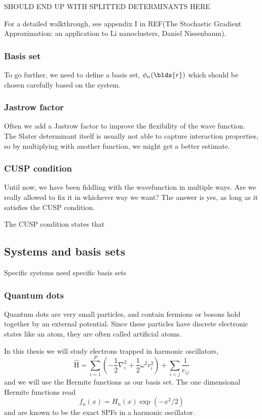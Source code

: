 SHOULD END UP WITH SPLITTED DETERMINANTS HERE

For a detailed walkthrough, see appendix I in REF(The Stochastic Gradient Approximation: an application to Li nanoclusters, Daniel Nissenbaum). 

\subsubsection{Basis set} \label{subsubsec:basisset}
To go further, we need to define a basis set, $\phi_n(\blds{r})$ which should be chosen carefully based on the system. 

\subsubsection{Jastrow factor} \label{subsubsec:jastrow}
Often we add a Jastrow factor to improve the flexibility of the wave function. The Slater determinant itself is usually not able to capture interaction properties, so by multiplying with another function, we might get a better estimate. 

\subsubsection{CUSP condition} \label{subsubsec:cusp}
Until now, we have been fiddling with the wavefunction in multiple ways. Are we really allowed to fix it in  whichever way we want? The answer is yes, as long as it satisfies the CUSP condition. 

The CUSP condition states that 

\subsection{Systems and basis sets} \label{subsec:potentials}
Specific systems need specific basis sets

\subsubsection{Quantum dots} \label{subsubsec:quantumdots}
Quantum dots are very small particles, and contain fermions or bosons hold together by an external potential. Since these particles have discrete electronic states like an atom, they are often called artificial atoms. 

In this thesis we will study electrons trapped in harmonic oscillators,
\begin{equation}
\label{eq:HOHamiltonian}
\hat{\text{H}} = \sum_{i=1}^{P} (-\frac{1}{2} \nabla_i^2 + \frac{1}{2} \omega^2 r_i ^2) + \sum_{i<j} \frac{1}{r_{ij}} 
\end{equation}
and we will use the Hermite functions as our basis set. The one dimensional Hermite functions read
\begin{equation}
f_n(x)=H_n(x)\exp(-x^2/2)
\end{equation}
and are known to be the exact SPFs in a harmonic oscillator. 


